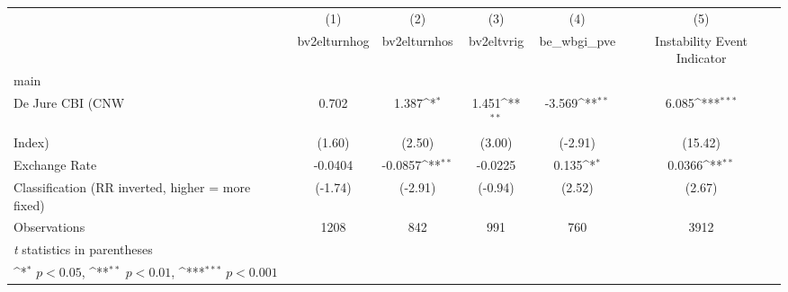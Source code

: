 {
\def\sym#1{\ifmmode^{#1}\else\(^{#1}\)\fi}
\begin{tabular}{l*{5}{c}}
\hline\hline
                    &\multicolumn{1}{c}{(1)}&\multicolumn{1}{c}{(2)}&\multicolumn{1}{c}{(3)}&\multicolumn{1}{c}{(4)}&\multicolumn{1}{c}{(5)}\\
                    &\multicolumn{1}{c}{bv2elturnhog}&\multicolumn{1}{c}{bv2elturnhos}&\multicolumn{1}{c}{bv2eltvrig}&\multicolumn{1}{c}{be\_wbgi\_pve}&\multicolumn{1}{c}{Instability Event Indicator}\\
\hline
main                &                     &                     &                     &                     &                     \\
De Jure CBI (CNW    &       0.702         &       1.387\sym{*}  &       1.451\sym{**} &      -3.569\sym{**} &       6.085\sym{***}\\
Index)              &      (1.60)         &      (2.50)         &      (3.00)         &     (-2.91)         &     (15.42)         \\
[1em]
Exchange Rate       &     -0.0404         &     -0.0857\sym{**} &     -0.0225         &       0.135\sym{*}  &      0.0366\sym{**} \\
Classification (RR inverted, higher = more fixed)&     (-1.74)         &     (-2.91)         &     (-0.94)         &      (2.52)         &      (2.67)         \\
\hline
Observations        &        1208         &         842         &         991         &         760         &        3912         \\
\hline\hline
\multicolumn{6}{l}{\footnotesize \textit{t} statistics in parentheses}\\
\multicolumn{6}{l}{\footnotesize \sym{*} \(p<0.05\), \sym{**} \(p<0.01\), \sym{***} \(p<0.001\)}\\
\end{tabular}
}
